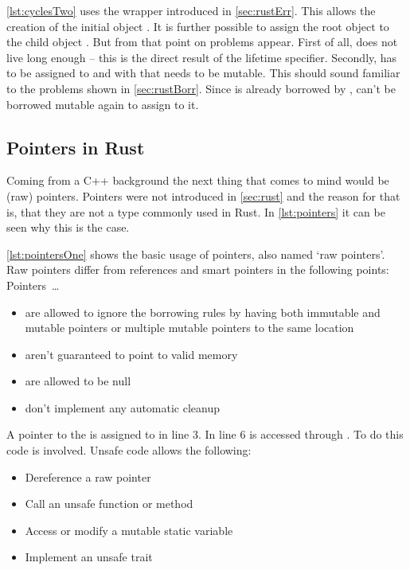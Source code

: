\documentclass[thesis]{subfiles}
\begin{document}
    \autoref{lst:cyclesTwo} uses the  wrapper introduced in \autoref{sec:rustErr}.
    This allows the creation of the initial \Node object .
    It is further possible to assign the root object  to the child object .
    But from that point on problems appear.
    First of all,  does not live long enough -- this is the direct result of the lifetime specifier.
    Secondly,  has to be assigned to  and with that  needs to be mutable.
    This should sound familiar to the problems shown in \autoref{sec:rustBorr}.
    Since  is already borrowed by ,  can't be borrowed mutable again to assign  to it.

  \subsection{Pointers in Rust}
    Coming from a C++ background the next thing that comes to mind would be (raw) pointers.
    Pointers were not introduced in \autoref{sec:rust} and the reason for that is, that they are not a type commonly used in Rust\autocite[Raw Pointers]{rust-book1}.
    In \autoref{lst:pointers} it can be seen why this is the case.

    \autoref{lst:pointersOne} shows the basic usage of pointers, also named `raw pointers'.
    Raw pointers differ from references and smart pointers in the following points\autocite[Unsafe Rust]{rust-book}: Pointers~\ldots
    \begin{itemize}
      \item are allowed to ignore the borrowing rules by having both immutable and mutable pointers or multiple mutable pointers to the same location
      \item aren't guaranteed to point to valid memory
      \item are allowed to be null
      \item don’t implement any automatic cleanup
    \end{itemize}
    A pointer to the \String {} is assigned to  in line 3.
    In line 6  is accessed through .
    To do this  code is involved.
    Unsafe code allows the following\autocite[Unsafe Rust]{rust-book}:
    \begin{itemize}
      \item Dereference a raw pointer
      \item Call an unsafe function or method
      \item Access or modify a mutable static variable
      \item Implement an unsafe trait
    \end{itemize}
\end{document}
